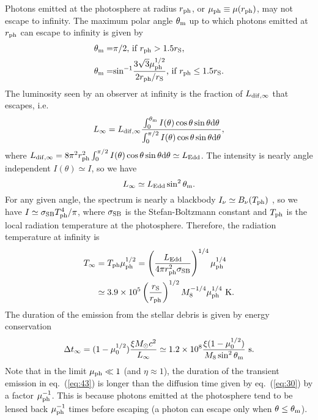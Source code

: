 \documentclass[useAMS,usenatbib]{mn2e}
\def\d{{\mathrm{d}}}
\begin{document}
Photons emitted at the photosphere at radius $r_{\rm ph}$, or
$\mu_{\rm ph}\equiv \mu(r_{\rm ph})$, may not escape to
infinity. The maximum polar angle
$\theta_{\rm m}$ up to which photons emitted at $r_{\rm ph}$ can escape to infinity is given by
\begin{equation}
  \label{eq:40}
  \begin{split}
       \theta_{\rm m} =  & \pi/2\mbox{, if $r_{\rm ph} > 1.5 r_{\rm S}$,}\\
    \theta_{\rm m} = & \mathrm{sin}^{-1}
      \frac{3\sqrt{3}\mu_{\rm ph}^{1/2}}{2r_{\rm ph}/r_{\rm
      S}} \mbox{, if $r_{\rm ph} \leq 1.5 r_{\rm S}$.}
  \end{split}
\end{equation}
The luminosity seen by an observer at infinity is the fraction of
$L_{\rm dif,\infty}$ that escapes, i.e.
\begin{equation}
  \label{eq:340}
      L_{\rm \infty}  = L_{\rm dif,\infty}\frac{\int_0^{\rm \theta_{\rm
            m}} I(\theta) \cos\theta \sin \theta\d \theta}{
        \int_0^{\pi/2} I(\theta) \cos\theta \sin \theta\d \theta},
\end{equation}
where $L_{\rm dif,\infty} = 8\pi^2r_{\rm ph}^2\int_0^{\pi/2} I(\theta) \cos\theta
\sin \theta\d \theta \simeq L_{\rm Edd}$. The intensity is
nearly angle independent $I(\theta)\simeq I$, so we have
\begin{equation}
  \label{eq:34}
  L_{\rm \infty}\simeq L_{\rm Edd}\sin^2\theta_{\rm m}.
\end{equation}
For any given angle, the spectrum is nearly a blackbody $I_{\nu}
\simeq B_{\nu}(T_{\rm ph})$ \citep[e.g.][]{2006ApJ...638L..21B}, so we
have $I\simeq \sigma_{\rm SB} T_{\rm ph}^4/\pi$, where $\sigma_{\rm
  SB}$ is the Stefan-Boltzmann constant and $T_{\rm ph}$ 
is the local radiation temperature at the photosphere. Therefore, the
radiation temperature at infinity is
\begin{equation}
  \label{eq:33}
  \begin{split}
              T_{\rm \infty} &= T_{\rm ph} \mu_{\rm ph}^{1/2} =
          \left(\frac{L_{\rm Edd}}{4\pi r_{\rm ph}^2\sigma_{\rm
                SB}} \right)^{1/4}\mu_{\rm ph}^{1/4}\\
          &\simeq 3.9\times10^5 \left(\frac{r_{\rm S}}{r_{\rm
                ph}}\right)^{1/2} M_8^{-1/4} \mu_{\rm ph}^{1/4}\rm\ K.
  \end{split}
\end{equation}
The duration of the emission from the stellar debris is given by
energy conservation
\begin{equation}
  \label{eq:43}
      \Delta t_{\rm \infty} = (1- \mu_0^{1/2})\frac{\xi M_{\rm
      \odot}c^2}{L_{\rm \infty}} \simeq 1.2\times 10^8 \frac{\xi (1-
    \mu_0^{1/2})}{M_8 
    \sin^2\theta_{\rm m} }\rm\ s. 
\end{equation}
Note that in the limit $\mu_{\rm ph}\ll 1$ (and $\eta\approx1$), the
duration of the transient emission in eq.~(\ref{eq:43}) 
is longer than the diffusion time given by eq.~(\ref{eq:30}) by a
factor $\mu_{\rm ph}^{-1}$. This is because photons emitted at the
photosphere tend to be lensed back $\mu_{\rm ph}^{-1}$ times before
escaping (a photon can escape only when $\theta\leq\theta_{\rm m}$).
\end{document}
